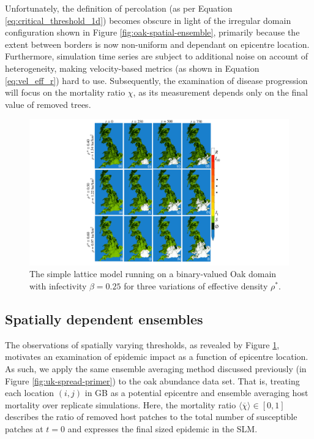 Unfortunately, the definition of percolation (as per Equation \ref{eq:critical_threshold_1d}) becomes obscure in light of the irregular domain configuration shown in 
Figure \ref{fig:oak-spatial-ensemble}, primarily because the extent between borders is now non-uniform
and dependant on epicentre location.
Furthermore, simulation time series are subject to additional noise on account of heterogeneity, 
making velocity-based metrics (as shown in Equation \ref{eq:vel_eff_r}) hard to use. 
Subsequently, the examination of disease progression will focus on the mortality ratio $\chi$, 
as its measurement depends only on the final value of removed trees.

\begin{figure}
    \centering
    \includegraphics[scale=0.490]{chapter4/figures/figure4.pdf}
    \caption{The simple lattice model running on a binary-valued Oak domain with infectivity $\beta=0.25$ for three variations of effective density $\rho^*$.}
    \label{fig:ch4_uk_spread}
\end{figure}

\subsection{Spatially dependent ensembles}
\label{sec:slm-spatial-ensembles}

The observations of spatially varying thresholds, as revealed by Figure \ref{fig:ch4_uk_spread}, 
motivates an examination of epidemic impact as a function of epicentre location.
As such, we apply the same ensemble averaging method discussed previously (in Figure \ref{fig:uk-spread-primer})
to the oak abundance data set. That is, treating each location $(i,j)$ in GB as a potential
epicentre and ensemble averaging host mortality over replicate simulations.
Here, the mortality ratio $\big\langle \overline{\chi} \big\rangle \in [0, 1]$ describes the ratio 
of removed host patches to the total number of susceptible patches at $t=0$ and 
expresses the final sized epidemic in the SLM. 

